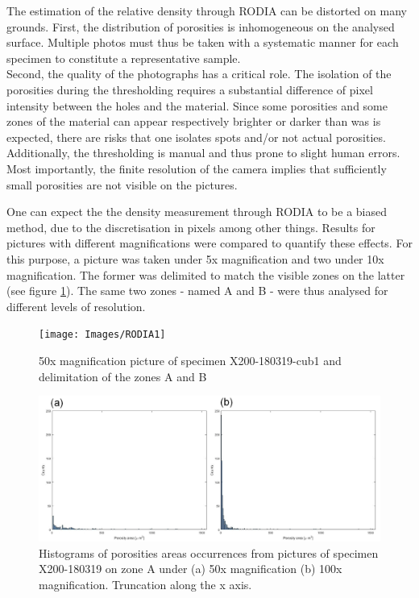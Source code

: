 The estimation of the relative density through RODIA can be distorted on many grounds. First, the distribution of porosities is inhomogeneous on the analysed surface. Multiple photos must thus be taken with a systematic manner for each specimen to constitute a representative sample.\\

Second, the quality of the photographs has a critical role. The isolation of the porosities during the thresholding requires a substantial difference of pixel intensity between the holes and the material. Since some porosities and some zones of the material can appear respectively brighter or darker than was is expected, there are risks that one isolates spots and/or not actual porosities. Additionally, the thresholding is manual and thus prone to slight human errors. \\

Most importantly, the finite resolution of the camera implies that sufficiently small porosities are not visible on the pictures. 

One can expect the the density measurement through RODIA to be a biased method, due to the discretisation in pixels among other things. Results for pictures with different magnifications were compared to quantify these effects. For this purpose, a picture was taken under 5x magnification and two under 10x magnification. The former was delimited to match the visible zones on the latter (see figure \ref{fig:RODIA1}). The same two zones - named A and B - were thus analysed for different levels of resolution.\\

\begin{figure}[ht]
	\centering
	\centerline{\texttt{[image: Images/RODIA1]}}
	\decoRule
	\caption[50x magnification picture of specimen X200-180319-cub1 and delimitation of the zones A and B]{50x magnification picture of specimen X200-180319-cub1 and delimitation of the zones A and B}
	\label{fig:RODIA1}
\end{figure}

\begin{figure}[ht]
	\centering
	\centerline{\includegraphics[scale=0.43]{Images/RODIAHist}}
	\decoRule
	\caption[Histograms of porosities areas occurrences from pictures of specimen X200-180319 on zone A under (a) 50x magnification (b) 100x magnification]{Histograms of porosities areas occurrences from pictures of specimen X200-180319 on zone A under (a) 50x magnification (b) 100x magnification. Truncation along the x axis. }
	\label{fig:RODIAH}
\end{figure}


